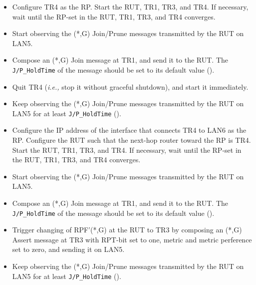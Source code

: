 \documentclass[11pt]{report}
\newcommand{\ie}{\emph{i.e.,}\xspace}
\begin{document}

\begin{itemize}

  \item Configure TR4 as the RP. Start the RUT, TR1, TR3, and TR4. If
  necessary, wait until the RP-set in the RUT, TR1, TR3, and TR4
  converges.

  \item Start observing the (*,G) Join/Prune messages transmitted by the
  RUT on LAN5.

  \item Compose an (*,G) Join message at TR1, and send it to the RUT. 
  The \verb=J/P_HoldTime= of the message should be set to its default
  value ({\PimsmJPHoldTime}).

  \item Quit TR4 (\ie stop it without graceful shutdown), and start it
  immediately.

  \item Keep observing the (*,G) Join/Prune messages transmitted by the
  RUT on LAN5 for at least \verb=J/P_HoldTime= ({\PimsmJPHoldTime}).

\end{itemize}


\begin{itemize}

  \item Configure the IP address of the interface that connects TR4 to LAN6 as
  the RP. Configure the RUT such that the next-hop router toward the RP is
  TR4. Start the RUT, TR1, TR3, and TR4. If necessary, wait until the
  RP-set in the RUT, TR1, TR3, and TR4 converges.

  \item Start observing the (*,G) Join/Prune messages transmitted by the
  RUT on LAN5.

  \item Compose an (*,G) Join message at TR1, and send it to the RUT. 
  The \verb=J/P_HoldTime= of the message should be set to its default
  value ({\PimsmJPHoldTime}).

  \item Trigger changing of RPF'(*,G) at the RUT to TR3 by composing an
  (*,G) Assert message at TR3 with RPT-bit set to one, metric and metric 
  perference set to zero, and sending it on LAN5.

  \item Keep observing the (*,G) Join/Prune messages transmitted by the
  RUT on LAN5 for at least \verb=J/P_HoldTime= ({\PimsmJPHoldTime}).

\end{itemize}
\end{document}
